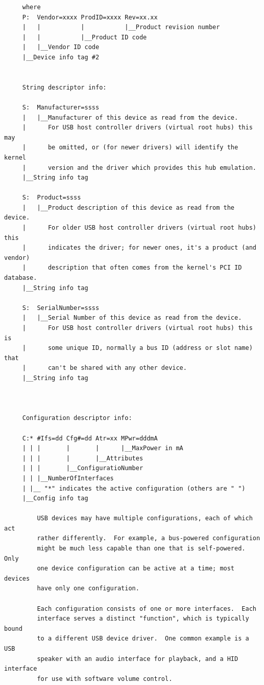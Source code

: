 \begin{verbatim}
     where
     P:  Vendor=xxxx ProdID=xxxx Rev=xx.xx
     |   |           |           |__Product revision number
     |   |           |__Product ID code
     |   |__Vendor ID code
     |__Device info tag #2
     
     
     String descriptor info:
     
     S:  Manufacturer=ssss
     |   |__Manufacturer of this device as read from the device.
     |      For USB host controller drivers (virtual root hubs) this may
     |      be omitted, or (for newer drivers) will identify the kernel
     |      version and the driver which provides this hub emulation.
     |__String info tag
     
     S:  Product=ssss
     |   |__Product description of this device as read from the device.
     |      For older USB host controller drivers (virtual root hubs) this
     |      indicates the driver; for newer ones, it's a product (and vendor)
     |      description that often comes from the kernel's PCI ID database.
     |__String info tag
     
     S:  SerialNumber=ssss
     |   |__Serial Number of this device as read from the device.
     |      For USB host controller drivers (virtual root hubs) this is
     |      some unique ID, normally a bus ID (address or slot name) that
     |      can't be shared with any other device.
     |__String info tag
     
     
     
     Configuration descriptor info:
     
     C:* #Ifs=dd Cfg#=dd Atr=xx MPwr=dddmA
     | | |       |       |      |__MaxPower in mA
     | | |       |       |__Attributes
     | | |       |__ConfiguratioNumber
     | | |__NumberOfInterfaces
     | |__ "*" indicates the active configuration (others are " ")
     |__Config info tag
     
         USB devices may have multiple configurations, each of which act
         rather differently.  For example, a bus-powered configuration
         might be much less capable than one that is self-powered.  Only
         one device configuration can be active at a time; most devices
         have only one configuration.
     
         Each configuration consists of one or more interfaces.  Each
         interface serves a distinct "function", which is typically bound
         to a different USB device driver.  One common example is a USB
         speaker with an audio interface for playback, and a HID interface
         for use with software volume control.
     

\end{verbatim}
